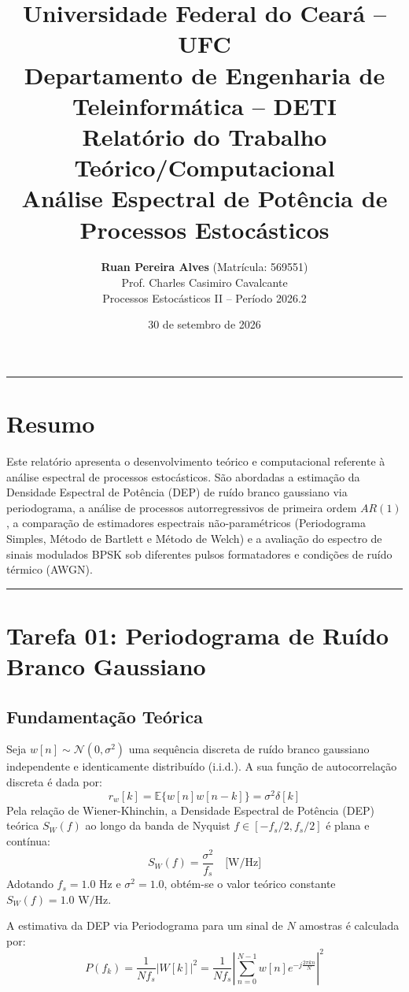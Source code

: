 \documentclass[12pt,a4paper]{article}
\title{\textbf{Universidade Federal do Ceará -- UFC}\\
\textbf{Departamento de Engenharia de Teleinformática -- DETI}\\
\Large Relatório do Trabalho Teórico/Computacional\\
\Large Análise Espectral de Potência de Processos Estocásticos}
\author{\textbf{Ruan Pereira Alves} (Matrícula: 569551)\\
Prof. Charles Casimiro Cavalcante\\
Processos Estocásticos II -- Período 2026.2}
\date{30 de setembro de 2026}
\begin{document}
\maketitle

\hrule
\vspace{0.5cm}

\section*{Resumo}
Este relatório apresenta o desenvolvimento teórico e computacional referente à análise espectral de processos estocásticos. São abordadas a estimação da Densidade Espectral de Potência (DEP) de ruído branco gaussiano via periodograma, a análise de processos autorregressivos de primeira ordem $AR(1)$, a comparação de estimadores espectrais não-paramétricos (Periodograma Simples, Método de Bartlett e Método de Welch) e a avaliação do espectro de sinais modulados BPSK sob diferentes pulsos formatadores e condições de ruído térmico (AWGN).

\vspace{0.5cm}
\hrule

\section{Tarefa 01: Periodograma de Ruído Branco Gaussiano}

\subsection{Fundamentação Teórica}
Seja $w[n] \sim \mathcal{N}(0, \sigma^2)$ uma sequência discreta de ruído branco gaussiano independente e identicamente distribuído (i.i.d.). A sua função de autocorrelação discreta é dada por:
\begin{equation}
r_w[k] = \mathbb{E}\{w[n]w[n-k]\} = \sigma^2 \delta[k]
\end{equation}
Pela relação de Wiener-Khinchin, a Densidade Espectral de Potência (DEP) teórica $S_W(f)$ ao longo da banda de Nyquist $f \in [-f_s/2, f_s/2]$ é plana e contínua:
\begin{equation}
S_W(f) = \frac{\sigma^2}{f_s} \quad \text{[W/Hz]}
\end{equation}
Adotando $f_s = 1.0 \text{ Hz}$ e $\sigma^2 = 1.0$, obtém-se o valor teórico constante $S_W(f) = 1.0 \text{ W/Hz}$.

A estimativa da DEP via Periodograma para um sinal de $N$ amostras é calculada por:
\begin{equation}
P(f_k) = \frac{1}{N f_s} |W[k]|^2 = \frac{1}{N f_s} \left| \sum_{n=0}^{N-1} w[n] e^{-j \frac{2\pi k n}{N}} \right|^2
\end{equation}
\end{document}
